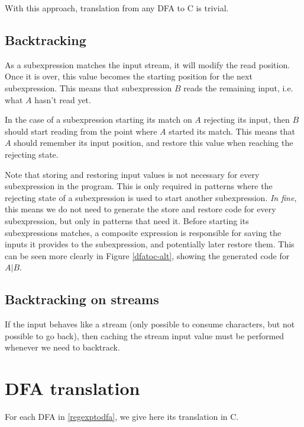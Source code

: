 \documentclass[11pt,a4paper]{report}
\newcommand{\regexp}[1]{$#1$}
\begin{document}
With this approach, translation from any DFA to C is trivial.

\subsection{Backtracking}

As a subexpression matches the input stream, it will modify the read position. Once it is over, this value becomes the starting position for the next subexpression. This means that subexpression $B$ reads the remaining input, i.e. what $A$ hasn't read yet.

In the case of a subexpression starting its match on $A$ rejecting its input, then $B$ should start reading from the point where $A$ started its match. This means that $A$ should remember its input position, and restore this value when reaching the rejecting state.

Note that storing and restoring input values is not necessary for every subexpression in the program. This is only required in patterns where the rejecting state of a subexpression is used to start another subexpression. \textit{In fine}, this means we do not need to generate the store and restore code for every subexpression, but only in patterns that need it. Before starting its subexpressions matches, a composite expression is responsible for saving the inputs it provides to the subexpression, and potentially later restore them. This can be seen more clearly in Figure \ref{dfatoc-alt}, showing the generated code for \regexp{A|B}.

\subsection{Backtracking on streams}

If the input behaves like a stream (only possible to consume characters, but not possible to go back), then caching the stream input value must be performed whenever we need to backtrack.

\section{DFA translation}

For each DFA in \ref{regexptodfa}, we give here its translation in C.
\end{document}
